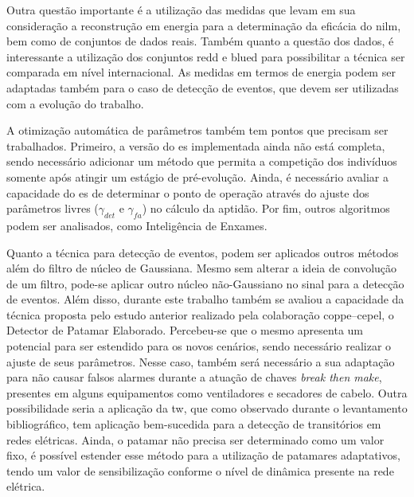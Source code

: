 Outra questão importante é a utilização das medidas que levam em sua
consideração a reconstrução em energia para a determinação da eficácia
do \acs{nilm}, bem como de conjuntos de dados reais. Também quanto a
questão dos dados, é interessante a utilização dos conjuntos
\acs{redd} e \acs{blued} para possibilitar a técnica ser comparada em
nível internacional. As medidas em termos de energia podem ser
adaptadas também para o caso de detecção de eventos, que devem ser
utilizadas com a evolução do trabalho.

A otimização automática de parâmetros também tem pontos que precisam
ser trabalhados. Primeiro, a versão do \acs{es} implementada ainda não
está completa, sendo necessário adicionar um método que permita a
competição dos indivíduos somente após atingir um estágio de
pré-evolução. Ainda, é necessário avaliar a capacidade do \acs{es} de
determinar o ponto de operação através do ajuste dos parâmetros livres
($\gamma_{det}$ e $\gamma_{fa}$) no cálculo da aptidão. Por
fim, outros algoritmos podem ser analisados, como Inteligência de
Enxames.

Quanto a técnica para detecção de eventos, podem ser aplicados outros
métodos além do filtro de núcleo de Gaussiana. Mesmo sem alterar a
ideia de convolução de um filtro, pode-se aplicar outro núcleo
não-Gaussiano no sinal para a detecção de eventos. Além disso,
durante este trabalho também se avaliou a capacidade da técnica
proposta pelo estudo anterior realizado pela colaboração
\acs{coppe}--\acs{cepel}, o Detector de Patamar Elaborado.
Percebeu-se que o mesmo apresenta um potencial para ser estendido para
os novos cenários, sendo necessário realizar o ajuste de seus
parâmetros. Nesse caso, também será necessário a sua adaptação para
não causar falsos alarmes durante a atuação de chaves \emph{break then
make}, presentes em alguns equipamentos como ventiladores e secadores
de cabelo. Outra possibilidade seria a aplicação da \acl{tw}, que como
observado durante o levantamento bibliográfico, tem aplicação
bem-sucedida para a detecção de transitórios em redes elétricas.
Ainda, o patamar não precisa ser determinado como um valor fixo, é
possível estender esse método para a utilização de patamares
adaptativos, tendo um valor de sensibilização conforme o nível de
dinâmica presente na rede elétrica.



